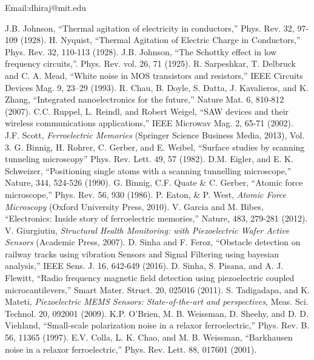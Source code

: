 \documentclass[12pt,column,showpacs,pre,preprintnumbers,amsmath,amssymb,aps,standalone]{revtex4-2}
\begin{document}
Email:dhiraj@mit.edu
\begin{thebibliography}{10}
J.B. Johnson, \enquote{Thermal agitation of electricity in conductors,} Phys. Rev. 32, 97-109 (1928).
H. Nyquist, \enquote{Thermal Agitation of Electric Charge in Conductors,} Phys. Rev. 32, 110-113 (1928).
 J.B. Johnson, \enquote{The Schottky effect in low frequency circuits,}. Phys. Rev. vol. 26, 71 (1925).
	 R. Sarpeshkar, T. Delbruck  and C. A. Mead, \enquote{White noise in MOS transistors
		and resistors,}
	IEEE Circuits Devices Mag. 9, 23–29 (1993).
	 R. Chau, B. Doyle, S. Datta, J. Kavalieros, and K. Zhang, \enquote{Integrated nanoelectronics for the future,} Nature Mat. 6, 810-812 (2007). 
	 C.C. Ruppel,  L. Reindl, and Robert Weigel, \enquote{SAW devices and their wireless communications applications,} IEEE Microwav Mag. 2, 65-71 (2002).
	 J.F. Scott, \emph{Ferroelectric Memories} (Springer Science Business Media, 2013), Vol. 3.
	 G. Binnig, H. Rohrer, C. Gerber, and E. Weibel, \enquote{Surface studies by scanning tunneling microscopy} Phys. Rev. Lett. 49, 57 (1982).
	 D.M. Eigler, and E. K. Schweizer, \enquote{Positioning single atoms with a scanning tunnelling microscope,} Nature, 344, 524-526 (1990).
	 G. Binnig, C.F. Quate \& C. Gerber, \enquote {Atomic force microscope,} Phys. Rev. 56, 930 (1986).
	P. Eaton, \& P. West, \textit{Atomic Force Microscopy} (Oxford University Press, 2010).
	 V. Garcia and M. Bibes, \enquote {Electronics: Inside story of ferroelectric memories,} Nature, 483, 279-281 (2012). 
	V. Giurgiutiu, \textit{Structural Health Monitoring: with Piezoelectric Wafer Active Sensors} (Academic Press, 2007). 
	D. Sinha and F. Feroz, \enquote {Obstacle detection on railway tracks using vibration Sensors and Signal Filtering using bayesian analysis,} IEEE Sens. J. 16, 642-649 (2016).
	 D. Sinha, S. Pisana, and A. J. Flewitt, \enquote{Radio frequency magnetic field detection using piezoelectric coupled microcantilevers,} Smart Mater. Struct. 20, 025016 (2011).
	S. Tadigadapa, and K. Mateti, \textit{Piezoelectric MEMS Sensors: State-of-the-art and perspectives,} Meas. Sci. Technol. 20, 092001 (2009).
	 K.P. O'Brien, M. B. Weissman, D. Sheehy, and D. D. Viehland, \enquote{Small-scale polarization noise in a relaxor ferroelectric,} Phys. Rev. B. 56, 11365 (1997).
	 E.V. Colla, L. K. Chao, and M. B. Weissman, \enquote {Barkhausen noise in a relaxor ferroelectric,} Phys. Rev. Lett. 88, 017601 (2001).

\end{thebibliography}
\end{document}
